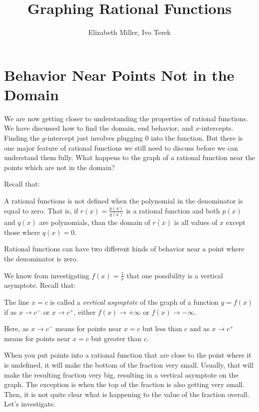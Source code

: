 \documentclass{ximera}
\author{Elizabeth Miller, Ivo Terek}
\title{Graphing Rational Functions}
\begin{document}
\licenseSZ
\begin{abstract}
\end{abstract}
\maketitle

\section{Behavior Near Points Not in the Domain}

We are now getting closer to understanding the properties of rational functions.  We have discussed how to find the domain, end behavior, and $x$-intercepts.  Finding the $y$-intercept just involves plugging $0$ into the function.  But there is one major feature of rational functions we still need to discuss before we can understand them fully.  What happens to the graph of a rational function near the points which are not in the domain?  

Recall that:

\begin{callout}
A rational functions is not defined when the polynomial in the denominator is equal to zero.  That is, if $r(x)=\frac{p(x)}{q(x)}$ is a rational function and both $p(x)$ and $q(x)$ are polynomials, than the domain of $r(x)$ is all values of $x$ except those where $q(x)=0$.  
\end{callout}

Rational functions can have two different kinds of behavior near a point where the denominator is zero.  

We know from investigating $f(x)=\frac{1}{x}$ that one possibility is a vertical asymptote.  Recall that:

\begin{definition}
The line $x=c$ is called a \emph{vertical asymptote} of the graph of a function $y=f(x)$ if as $x \to c^-$ or $x \to c^+$, either $f(x) \to +\infty$ or $f(x) \to -\infty$.  

Here, as $x \to c^-$ means for points near $x=c$ but less than $c$ and as $x \to c^+$ means for points near $x=c$ but greater than $c$.
\end{definition}

When you put points into a rational function that are close to the point where it is undefined, it will make the bottom of the fraction very small.  Usually, that will make the resulting fraction very big, resulting in a vertical asymptote on the graph.  The exception is when the top of the fraction is also getting very small.  Then, it is not quite clear what is happening to the value of the fraction overall.  Let's investigate.
\end{document}
